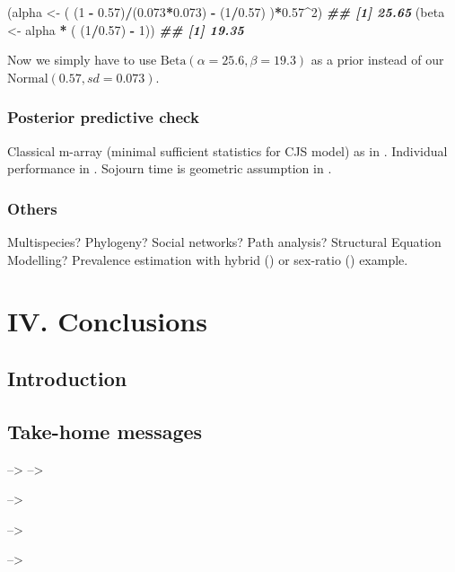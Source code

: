 \documentclass[
  12pt,
]{krantz}
\newenvironment{Shaded}{\begin{snugshade}}{\end{snugshade}}
\newcommand{\DecValTok}[1]{\textcolor[rgb]{0.00,0.00,0.81}{#1}}
\newcommand{\DocumentationTok}[1]{\textcolor[rgb]{0.56,0.35,0.01}{\textbf{\textit{#1}}}}
\newcommand{\FloatTok}[1]{\textcolor[rgb]{0.00,0.00,0.81}{#1}}
\newcommand{\NormalTok}[1]{#1}
\newcommand{\OtherTok}[1]{\textcolor[rgb]{0.56,0.35,0.01}{#1}}
\newcommand{\SpecialCharTok}[1]{\textcolor[rgb]{0.81,0.36,0.00}{\textbf{#1}}}
\begin{document}
\begin{Shaded}
\begin{Highlighting}[]
\NormalTok{(alpha }\OtherTok{\textless{}{-}}\NormalTok{ ( (}\DecValTok{1} \SpecialCharTok{{-}} \FloatTok{0.57}\NormalTok{)}\SpecialCharTok{/}\NormalTok{(}\FloatTok{0.073}\SpecialCharTok{*}\FloatTok{0.073}\NormalTok{) }\SpecialCharTok{{-}}\NormalTok{ (}\DecValTok{1}\SpecialCharTok{/}\FloatTok{0.57}\NormalTok{) )}\SpecialCharTok{*}\FloatTok{0.57}\SpecialCharTok{\^{}}\DecValTok{2}\NormalTok{)}
\DocumentationTok{\#\# [1] 25.65}
\NormalTok{(beta }\OtherTok{\textless{}{-}}\NormalTok{ alpha }\SpecialCharTok{*}\NormalTok{ ( (}\DecValTok{1}\SpecialCharTok{/}\FloatTok{0.57}\NormalTok{) }\SpecialCharTok{{-}} \DecValTok{1}\NormalTok{))}
\DocumentationTok{\#\# [1] 19.35}
\end{Highlighting}
\end{Shaded}

Now we simply have to use \(\text{Beta}(\alpha = 25.6,\beta = 19.3)\) as a prior instead of our \(\text{Normal}(0.57, sd = 0.073)\).

\hypertarget{posterior-predictive-check}{%
\section{Posterior predictive check}\label{posterior-predictive-check}}

Classical m-array (minimal sufficient statistics for CJS model) as in \citet{paganin2023computational}. Individual performance in \citet{chambert2014}. Sojourn time is geometric assumption in \citet{conn2018}.

\hypertarget{others}{%
\section{Others}\label{others}}

Multispecies? Phylogeny? Social networks? Path analysis? Structural Equation Modelling? Prevalence estimation with hybrid (\citet{SantostasiEtAl2019}) or sex-ratio (\citet{pradel2008sex}) example.

\hypertarget{part-iv.-conclusions}{%
\part{IV. Conclusions}\label{part-iv.-conclusions}}

\hypertarget{introduction-8}{%
\chapter*{Introduction}\label{introduction-8}}


\hypertarget{take-home-messages}{%
\chapter*{Take-home messages}\label{take-home-messages}}


--\textgreater{}
--\textgreater{}

--\textgreater{}

--\textgreater{}

--\textgreater{}

\backmatter

  

\printindex
\end{document}
